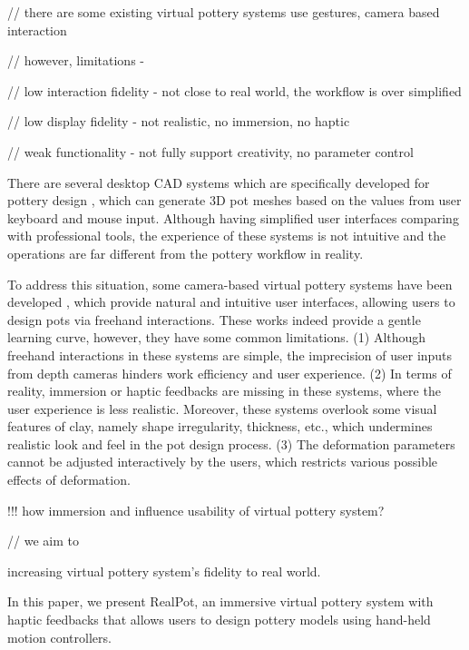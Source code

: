 \documentclass{svjour3}                     %
\begin{document}
// there are some existing virtual pottery systems
\cite{ramani2015gesture,murugappan2013handy,han2014virtual}
use gestures, camera based interaction

// however, limitations -

// low interaction fidelity - not close to real world, the workflow is over simplified

// low display fidelity - not realistic, no immersion, no haptic

// weak functionality - not fully support creativity, no parameter control


There are several desktop CAD systems which are specifically developed for pottery design \cite{koutsoudis2009qp,kumar2011wheel}, which can generate 3D pot meshes based on the values from user keyboard and mouse input. Although having simplified user interfaces comparing with professional tools, the experience of these systems is not intuitive and the operations are far different from the pottery workflow in reality.

To address this situation, some camera-based virtual pottery systems have been developed \cite{ramani2015gesture,murugappan2013handy,han2014virtual}, which provide natural and intuitive user interfaces, allowing users to design pots via freehand interactions.
These works indeed provide a gentle learning curve, however, they have some common limitations.
(1) Although freehand interactions in these systems are simple, the imprecision of user inputs from depth cameras hinders work efficiency and user experience.
%
(2) In terms of reality, immersion or haptic feedbacks are missing in these systems, where the user experience is less realistic. Moreover, these systems overlook some visual features of clay, namely shape irregularity, thickness, etc., which undermines realistic look and feel in the pot design process.
%
(3) The deformation parameters cannot be adjusted interactively by the users, which restricts various possible effects of deformation.


!!! how immersion and influence usability of virtual pottery system?


// we aim to


increasing virtual pottery system's fidelity to real world.


In this paper, we present RealPot, an immersive virtual pottery system with haptic feedbacks that allows users to design pottery models using hand-held motion controllers.
\end{document}
